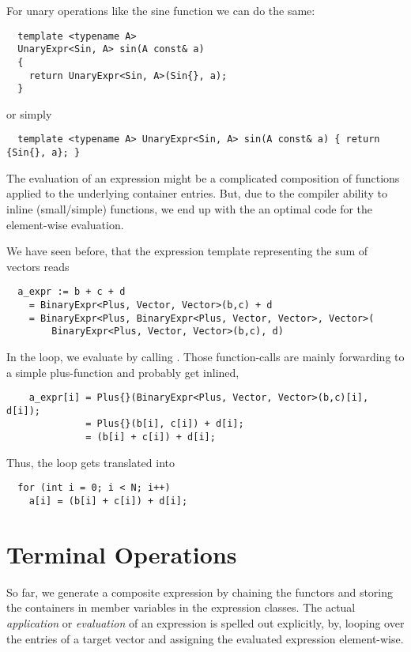 For unary operations like the sine function we can do the same:
%
\begin{verbatim}
  template <typename A>
  UnaryExpr<Sin, A> sin(A const& a)
  {
    return UnaryExpr<Sin, A>(Sin{}, a);
  }
\end{verbatim}
%
or simply
%
\begin{verbatim}
  template <typename A> UnaryExpr<Sin, A> sin(A const& a) { return {Sin{}, a}; }
\end{verbatim}

The evaluation of an expression might be a complicated composition of functions applied to the
underlying container entries. But, due to the compiler ability to inline (small/simple) functions, we
end up with the an optimal code for the element-wise evaluation.

\begin{example}
  We have seen before, that the expression template representing the sum of vectors reads
  \begin{verbatim}
  a_expr := b + c + d
    = BinaryExpr<Plus, Vector, Vector>(b,c) + d
    = BinaryExpr<Plus, BinaryExpr<Plus, Vector, Vector>, Vector>(
        BinaryExpr<Plus, Vector, Vector>(b,c), d)
  \end{verbatim}
  In the loop, we evaluate by calling . Those function-calls are mainly forwarding
  to a simple plus-function and probably get inlined, \ie
  \begin{verbatim}
    a_expr[i] = Plus{}(BinaryExpr<Plus, Vector, Vector>(b,c)[i], d[i]);
              = Plus{}(b[i], c[i]) + d[i];
              = (b[i] + c[i]) + d[i];
  \end{verbatim}
  Thus, the loop gets translated into
  \begin{verbatim}
  for (int i = 0; i < N; i++)
    a[i] = (b[i] + c[i]) + d[i];
  \end{verbatim}
\end{example}


\section{Terminal Operations}
So far, we generate a composite expression by chaining the functors and storing the containers in
member variables in the expression classes. The actual \textit{application} or \textit{evaluation}
of an expression is spelled out explicitly, by, \eg looping over the entries of a target vector and
assigning the evaluated expression element-wise.

